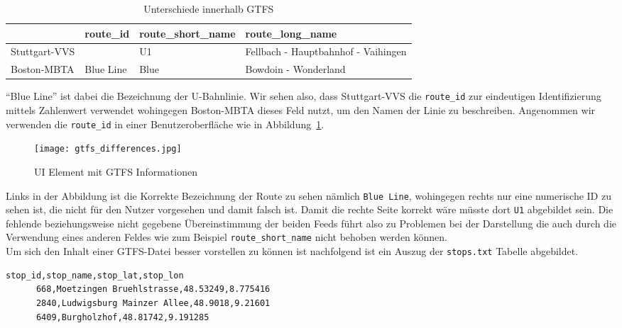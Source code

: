 \begin{newpage}
    \begin{longtable}{|>{\raggedright \arraybackslash}p{3.0cm}|>{\raggedright \arraybackslash}p{2.0cm}|>{\raggedright \arraybackslash}p{3.5cm}|>{\raggedright \arraybackslash}p{5.5cm}|}
    \caption{Unterschiede innerhalb GTFS} 
    \label{table:gtfs_differences}\\
      \hline
       & route\_id & route\_short\_name & route\_long\_name\\
      \hline
      Stuttgart-VVS & 379 & U1 & Fellbach - Hauptbahnhof - Vaihingen\\
      \hline
      Boston-MBTA & Blue Line & Blue & Bowdoin - Wonderland\\
      \hline
    \end{longtable}

    "`Blue Line"' ist dabei die Bezeichnung der U-Bahnlinie\parencite{wiki_blue_line}. Wir sehen also, dass Stuttgart-VVS die \texttt{route\_id} zur eindeutigen Identifizierung mittels Zahlenwert verwendet wohingegen Boston-MBTA dieses Feld nutzt, um den Namen der Linie zu beschreiben. Angenommen wir verwenden die \texttt{route\_id} in einer Benutzeroberfläche wie in Abbildung~\ref{fig:gtfs_differences}.

    \begin{figure}[htbp]
      \begin{center}
        \texttt{[image: gtfs\_differences.jpg]}
        \caption{UI Element mit GTFS Informationen}
        \label{fig:gtfs_differences}
      \end{center}
    \end{figure}

    Links in der Abbildung ist die Korrekte Bezeichnung der Route zu sehen nämlich \texttt{Blue Line}, wohingegen rechts nur eine numerische ID zu sehen ist, die nicht für den Nutzer vorgesehen und damit falsch ist. Damit die rechte Seite korrekt wäre müsste dort \texttt{U1} abgebildet sein. Die fehlende beziehungsweise nicht gegebene Übereinstimmung der beiden Feeds führt also zu Problemen bei der Darstellung die auch durch die Verwendung eines anderen Feldes wie zum Beispiel \texttt{route\_short\_name} nicht behoben werden können.\\

    Um sich den Inhalt einer GTFS-Datei besser vorstellen zu können ist nachfolgend ist ein Auszug der \texttt{stops.txt} Tabelle abgebildet.

    \begin{lstlisting}[captionpos=b, caption=Auszug der ersten Zeilen von \texttt{stops.txt}, label=lst:gtfs-auszug]
      stop_id,stop_name,stop_lat,stop_lon
      668,Moetzingen Bruehlstrasse,48.53249,8.775416
      2840,Ludwigsburg Mainzer Allee,48.9018,9.21601
      6409,Burgholzhof,48.81742,9.191285
    \end{lstlisting}


\end{newpage}
